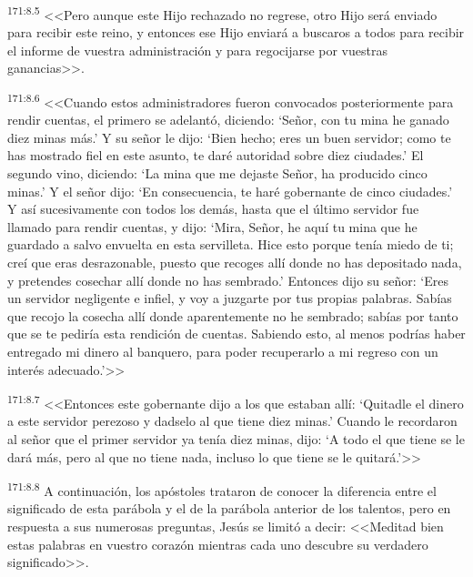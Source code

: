\par 
\textsuperscript{171:8.5} <<Pero aunque este Hijo rechazado no regrese, otro Hijo será enviado para recibir este reino, y entonces ese Hijo enviará a buscaros a todos para recibir el informe de vuestra administración y para regocijarse por vuestras ganancias>>.

\par 
\textsuperscript{171:8.6} <<Cuando estos administradores fueron convocados posteriormente para rendir cuentas, el primero se adelantó, diciendo: `Señor, con tu mina he ganado diez minas más.' Y su señor le dijo: `Bien hecho; eres un buen servidor; como te has mostrado fiel en este asunto, te daré autoridad sobre diez ciudades.' El segundo vino, diciendo: `La mina que me dejaste Señor, ha producido cinco minas.' Y el señor dijo: `En consecuencia, te haré gobernante de cinco ciudades.' Y así sucesivamente con todos los demás, hasta que el último servidor fue llamado para rendir cuentas, y dijo: `Mira, Señor, he aquí tu mina que he guardado a salvo envuelta en esta servilleta. Hice esto porque tenía miedo de ti; creí que eras desrazonable, puesto que recoges allí donde no has depositado nada, y pretendes cosechar allí donde no has sembrado.' Entonces dijo su señor: `Eres un servidor negligente e infiel, y voy a juzgarte por tus propias palabras. Sabías que recojo la cosecha allí donde aparentemente no he sembrado; sabías por tanto que se te pediría esta rendición de cuentas. Sabiendo esto, al menos podrías haber entregado mi dinero al banquero, para poder recuperarlo a mi regreso con un interés adecuado.'>>

\par 
\textsuperscript{171:8.7} <<Entonces este gobernante dijo a los que estaban allí: `Quitadle el dinero a este servidor perezoso y dadselo al que tiene diez minas.' Cuando le recordaron al señor que el primer servidor ya tenía diez minas, dijo: `A todo el que tiene se le dará más, pero al que no tiene nada, incluso lo que tiene se le quitará.'>>

\par 
\textsuperscript{171:8.8} A continuación, los apóstoles trataron de conocer la diferencia entre el significado de esta parábola y el de la parábola anterior de los talentos, pero en respuesta a sus numerosas preguntas, Jesús se limitó a decir: <<Meditad bien estas palabras en vuestro corazón mientras cada uno descubre su verdadero significado>>.

